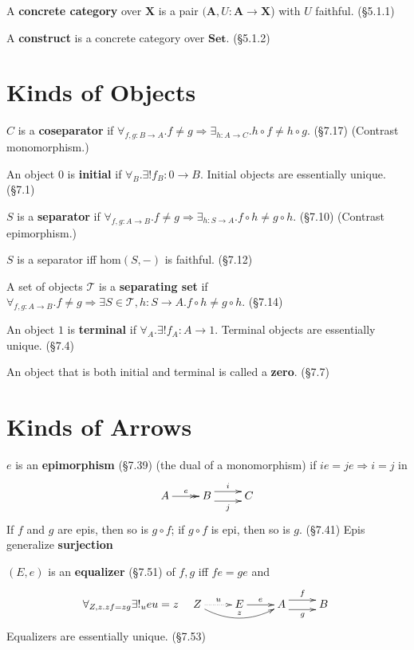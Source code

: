 \documentclass[10pt,twocolumn,letterpaper]{article}
\newcommand{\defn}[1]{{\bf #1}}
\begin{document}
  A \defn{concrete category} over $\mathbf{X}$ is a pair $(\mathbf{A},U :
  \mathbf{A} \to \mathbf{X}$) with $U$ faithful. (\S5.1.1)

  A \defn{construct} is a concrete category over $\mathbf{Set}$. (\S5.1.2)

\section{Kinds of Objects}

  $C$ is a \defn{coseparator} if $\forall_{f,g : B \to A} . f \ne g
  \Rightarrow \exists_{h : A \to C} . h \circ f \ne h \circ g$. (\S7.17)
  (Contrast monomorphism.)

  An object $0$ is \defn{initial} if $\forall_B . \exists! f_B : 0 \to B$.
  Initial objects are essentially unique. (\S7.1)

  $S$ is a \defn{separator} if $\forall_{f,g : A \to B} . f \ne g
  \Rightarrow \exists_{h : S \to A} . f \circ h \ne g \circ h$. (\S7.10)
  (Contrast epimorphism.)

  $S$ is a separator iff $\mbox{hom}(S,-)$ is faithful. (\S7.12)

  A set of objects $\mathcal{T}$ is a \defn{separating set} if
  $\forall_{f,g : A \to B} . f \ne g \Rightarrow \exists{S \in \mathcal{T},
  h : S \to A} . f \circ h \ne g \circ h$. (\S7.14)

  An object $1$ is \defn{terminal} if $\forall_A . \exists! f_A : A \to 1$.
  Terminal objects are essentially unique. (\S7.4)

  An object that is both initial and terminal is called a \defn{zero}.
  (\S7.7)

\section{Kinds of Arrows}

  $e$ is an \defn{epimorphism} (\S7.39) (the dual of a monomorphism) if
  $ie = je \Rightarrow i = j$ in
    \[\xymatrix{A \ar@{->>}[r]^e & B \ar@<1ex>[r]^{i} \ar@<-1ex>[r]_j & C} \]
  If $f$ and $g$ are epis, then so is $g \circ f$; if $g \circ f$ is epi,
  then so is $g$. (\S7.41)  Epis generalize \defn{surjection} 

  $(E,e)$ is an \defn{equalizer} (\S7.51) of $f,g$ iff $fe = ge$ and
     \[\forall_{Z,z . zf = zg} \exists!_u eu = z \quad
     \xymatrix{
     Z \ar@{..>}[r]^u \ar@/_1pc/[rr]^{z} & E \ar[r]^e & A \ar@<1ex>[r]^f \ar@<-1ex>[r]_g & B \\
     }\]
  Equalizers are essentially unique. (\S7.53)
\end{document}

